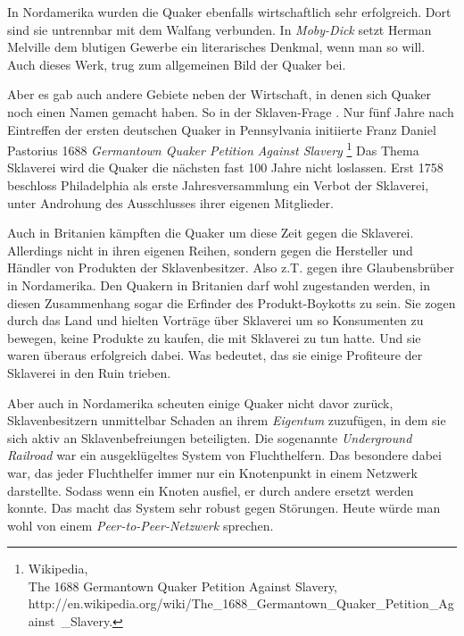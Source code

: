 \medskip

In Nordamerika wurden die Quaker ebenfalls wirtschaftlich sehr erfolgreich. Dort
sind sie untrennbar mit dem Walfang  verbunden. In
\textit{Moby-Dick} setzt
Herman Melville  dem blutigen Gewerbe ein
literarisches Denkmal, wenn man so
will. Auch dieses Werk, trug zum allgemeinen Bild der Quaker bei.

\medskip

Aber es gab auch andere Gebiete neben der Wirtschaft, in denen sich Quaker noch
einen
Namen gemacht haben. So in der Sklaven-Frage . Nur fünf Jahre
nach Eintreffen
der ersten deutschen Quaker in Pennsylvania initiierte Franz Daniel Pastorius
1688 \textit{Germantown Quaker Petition Against Slavery}
\footnote{Wikipedia,
\\The 1688 Germantown Quaker Petition Against Slavery,
\\http://en.wikipedia.org/wiki/The\_1688\_Germantown\_Quaker\_Petition\_Against\
\_Slavery.} Das Thema Sklaverei wird die Quaker die nächsten fast 100 Jahre
nicht
loslassen. Erst 1758 beschloss Philadelphia  als erste
Jahresversammlung ein Verbot der Sklaverei,
unter Androhung des Ausschlusses ihrer eigenen Mitglieder.

\medskip

Auch in Britanien kämpften die Quaker um diese Zeit gegen die Sklaverei.
Allerdings nicht in ihren eigenen Reihen, sondern gegen die Hersteller
und Händler von Produkten der Sklavenbesitzer. Also z.T. gegen ihre
Glaubensbrüber in Nordamerika. Den Quakern in Britanien darf wohl zugestanden
werden, in diesen Zusammenhang sogar die Erfinder des Produkt-Boykotts
\index{Boykott} zu sein.
Sie zogen durch das Land und hielten Vorträge über Sklaverei um so Konsumenten
zu
bewegen, keine Produkte zu kaufen, die mit Sklaverei zu tun hatte. Und sie
waren überaus erfolgreich dabei. Was bedeutet, das sie einige Profiteure der
Sklaverei in den Ruin trieben.

\medskip

Aber auch in Nordamerika  scheuten einige Quaker nicht
davor zurück,
Sklavenbesitzern unmittelbar Schaden an ihrem \textit{Eigentum} zuzufügen, in
dem sie sich aktiv an Sklavenbefreiungen beteiligten. Die sogenannte
\textit{Underground Railroad} \index{Underground Railroad} war ein
ausgeklügeltes System von Fluchthelfern. Das
besondere dabei war, das jeder Fluchthelfer  immer
nur ein Knotenpunkt in einem
Netzwerk darstellte. Sodass wenn ein Knoten ausfiel, er durch andere ersetzt
werden konnte. Das macht das System sehr robust gegen Störungen. Heute würde man
wohl
von einem \textit{Peer-to-Peer-Netzwerk} sprechen.

